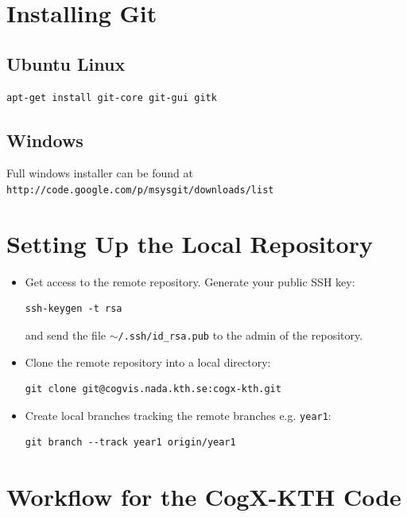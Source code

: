 \documentclass[a4paper,10pt]{article}
\begin{document}
\section{Installing Git}
\subsection{Ubuntu Linux}
  \begin{lstlisting}
apt-get install git-core git-gui gitk
  \end{lstlisting}

\subsection{Windows}
  Full windows installer can be found at \\
  \texttt{http://code.google.com/p/msysgit/downloads/list}



\section{Setting Up the Local Repository}
\begin{itemize}
  \item Get access to the remote repository. Generate your public SSH key:
    \begin{lstlisting}
ssh-keygen -t rsa
    \end{lstlisting}
    and send the file \texttt{$\sim$/.ssh/id\_rsa.pub} to the admin of the repository.
  \item Clone the remote repository into a local directory:
    \begin{lstlisting}
git clone git@cogvis.nada.kth.se:cogx-kth.git
    \end{lstlisting}
  \item Create local branches tracking the remote branches e.g. \texttt{year1}:
    \begin{lstlisting}
git branch --track year1 origin/year1
    \end{lstlisting}
\end{itemize}


\section{Workflow for the CogX-KTH Code}
\end{document}
